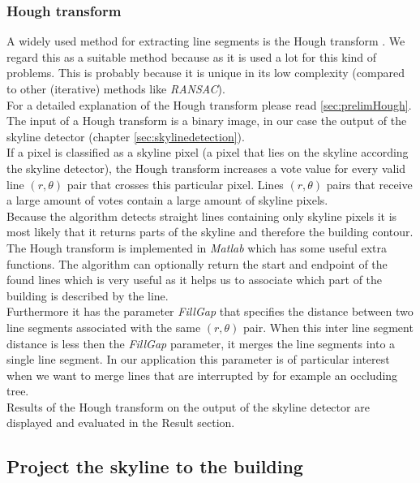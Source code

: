 \subsubsection{Hough transform}
	A widely used method for extracting line segments is the Hough transform
	\cite{Hough}.
	We regard this as a suitable method because as it is
	used a lot for this kind of problems. This is probably because it is unique
	in its low complexity (compared to other (iterative) methods like
	\emph{RANSAC}).\\
	For a detailed explanation of the Hough transform please read \ref{sec:prelimHough}.
	The input of a Hough transform is a binary image, in our case the output of 
	the skyline detector (chapter \ref{sec:skylinedetection}).\\
	If a pixel is classified as a skyline pixel (a pixel that lies on the
	skyline according the skyline detector), the Hough transform increases
	a vote value for every valid line $(r,\theta)$ pair that crosses this
	particular pixel.  
	Lines $(r,\theta)$ pairs that receive a large amount of votes
	contain a large amount of skyline pixels.\\
	Because the algorithm detects straight lines containing only skyline pixels it is
	most likely that it returns parts of the skyline and therefore the building
	contour. \\ 
	The Hough transform is implemented in \emph{Matlab} which has
	some useful extra functions. The algorithm can optionally return the start
	and endpoint of the found lines which is very useful as it helps us to
	associate which part of the building is described by the line.\\
	Furthermore it has the parameter \emph{FillGap} that specifies the distance
	between two line segments associated with the same $(r,\theta)$ pair.  When this
	inter line segment distance is less then the \emph{FillGap} parameter, it
	merges the line segments into a single line segment. In our application
	this parameter is of particular interest when we want to merge lines that
	are interrupted by for example an occluding tree.\\
	Results of the Hough transform on the output of the skyline detector are
	displayed and evaluated in the Result section.


\subsection{Project the skyline to the building}

